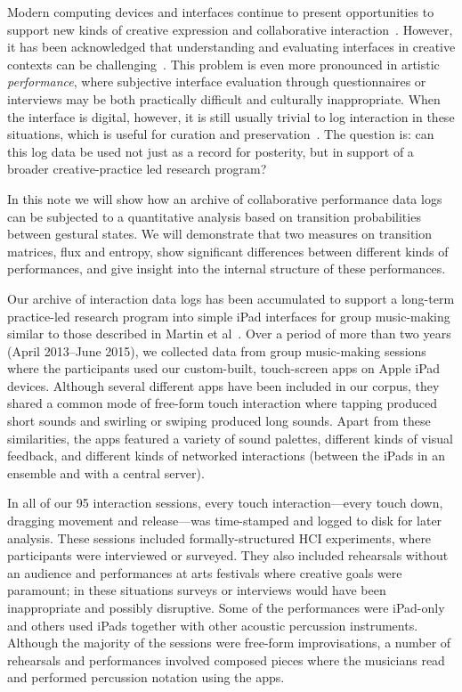\documentclass{sigchi}
\begin{document}
Modern computing devices and interfaces continue to present
opportunities to support new kinds of creative expression and
collaborative interaction~\cite{Resnick:2005yu}. However, it has been
acknowledged that understanding and evaluating interfaces in creative
contexts can be challenging~\cite{Shneiderman:2007qv}. This problem is
even more pronounced in artistic \emph{performance}, where subjective
interface evaluation through questionnaires or interviews may be both
practically difficult and culturally inappropriate. When the interface
is digital, however, it is still usually trivial to log interaction in
these situations, which is useful for curation and
preservation~\cite{England:2014ys}. The question is: can this log data
be used not just as a record for posterity, but in support of a
broader creative-practice led research program?

In this note we will show how an archive of collaborative performance
data logs can be subjected to a quantitative analysis based on
transition probabilities between gestural states. We will demonstrate
that two measures on transition matrices, flux and entropy, show
significant differences between different kinds of performances, and
give insight into the internal structure of these performances.

Our archive of interaction data logs has been accumulated to support a
long-term practice-led research program into simple iPad interfaces
for group music-making similar to those described in Martin et
al~\cite{Martin:2014cr}. Over a period of more than two years (April
2013--June 2015), we collected data from group music-making sessions
where the participants used our custom-built, touch-screen apps on
Apple iPad devices. Although several different apps have been included
in our corpus, they shared a common mode of free-form touch
interaction where tapping produced short sounds and swirling or
swiping produced long sounds. Apart from these similarities, the apps
featured a variety of sound palettes, different kinds of visual
feedback, and different kinds of networked interactions (between the
iPads in an ensemble and with a central server).

In all of our 95 interaction sessions, every touch interaction---every
touch down, dragging movement and release---was time-stamped and
logged to disk for later analysis. These sessions included
formally-structured HCI experiments, where participants were
interviewed or surveyed. They also included rehearsals without an
audience and performances at arts festivals where creative goals were
paramount; in these situations surveys or interviews would have been
inappropriate and possibly disruptive. Some of the performances were
iPad-only and others used iPads together with other acoustic
percussion instruments. Although the majority of the sessions were
free-form improvisations, a number of rehearsals and performances
involved composed pieces where the musicians read and performed
percussion notation using the apps.
\end{document}
